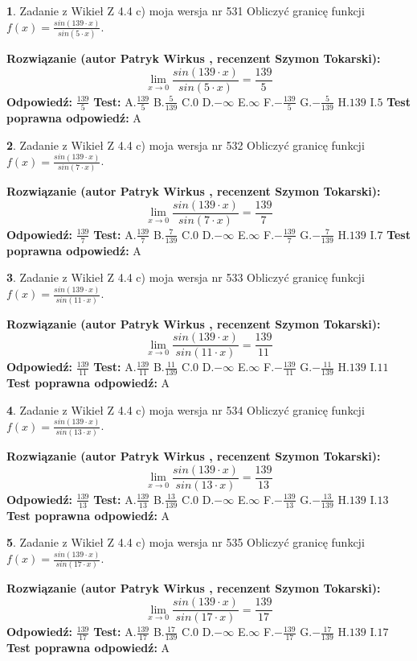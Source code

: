 \documentclass[12pt, a4paper]{article}
\theoremstyle{definition} %
\newtheorem{zad}{}
\newcommand{\zadStart}[1]{\begin{zad}#1\newline}
\newcommand{\zadStop}{\end{zad}}
\newcommand{\rozwStart}[2]{\noindent \textbf{Rozwiązanie (autor #1 , recenzent #2): }\newline}
\newcommand{\rozwStop}{\newline}
\newcommand{\odpStart}{\noindent \textbf{Odpowiedź:}\newline}
\newcommand{\odpStop}{\newline}
\newcommand{\testStart}{\noindent \textbf{Test:}\newline}
\newcommand{\testStop}{\newline}
\newcommand{\kluczStart}{\noindent \textbf{Test poprawna odpowiedź:}\newline}
\newcommand{\kluczStop}{\newline}
\begin{document}
\zadStart{Zadanie z Wikieł Z 4.4 c) moja wersja nr 531}
Obliczyć granicę funkcji $f(x)=\frac{sin(139\cdot x)}{sin(5\cdot x)}$.
\zadStop
\rozwStart{Patryk Wirkus}{Szymon Tokarski}
$$\lim\limits_{x\to 0}\frac{sin(139\cdot x)}{sin(5\cdot x)}=
\frac{139}{5}$$
\rozwStop
\odpStart
$\frac{139}{5}$
\odpStop
\testStart
A.$\frac{139}{5}$
B.$\frac{5}{139}$
C.$0$
D.$-\infty$
E.$\infty$
F.$-\frac{139}{5}$
G.$-\frac{5}{139}$
H.$139$
I.$5$
\testStop
\kluczStart
A
\kluczStop



\zadStart{Zadanie z Wikieł Z 4.4 c) moja wersja nr 532}
Obliczyć granicę funkcji $f(x)=\frac{sin(139\cdot x)}{sin(7\cdot x)}$.
\zadStop
\rozwStart{Patryk Wirkus}{Szymon Tokarski}
$$\lim\limits_{x\to 0}\frac{sin(139\cdot x)}{sin(7\cdot x)}=
\frac{139}{7}$$
\rozwStop
\odpStart
$\frac{139}{7}$
\odpStop
\testStart
A.$\frac{139}{7}$
B.$\frac{7}{139}$
C.$0$
D.$-\infty$
E.$\infty$
F.$-\frac{139}{7}$
G.$-\frac{7}{139}$
H.$139$
I.$7$
\testStop
\kluczStart
A
\kluczStop



\zadStart{Zadanie z Wikieł Z 4.4 c) moja wersja nr 533}
Obliczyć granicę funkcji $f(x)=\frac{sin(139\cdot x)}{sin(11\cdot x)}$.
\zadStop
\rozwStart{Patryk Wirkus}{Szymon Tokarski}
$$\lim\limits_{x\to 0}\frac{sin(139\cdot x)}{sin(11\cdot x)}=
\frac{139}{11}$$
\rozwStop
\odpStart
$\frac{139}{11}$
\odpStop
\testStart
A.$\frac{139}{11}$
B.$\frac{11}{139}$
C.$0$
D.$-\infty$
E.$\infty$
F.$-\frac{139}{11}$
G.$-\frac{11}{139}$
H.$139$
I.$11$
\testStop
\kluczStart
A
\kluczStop



\zadStart{Zadanie z Wikieł Z 4.4 c) moja wersja nr 534}
Obliczyć granicę funkcji $f(x)=\frac{sin(139\cdot x)}{sin(13\cdot x)}$.
\zadStop
\rozwStart{Patryk Wirkus}{Szymon Tokarski}
$$\lim\limits_{x\to 0}\frac{sin(139\cdot x)}{sin(13\cdot x)}=
\frac{139}{13}$$
\rozwStop
\odpStart
$\frac{139}{13}$
\odpStop
\testStart
A.$\frac{139}{13}$
B.$\frac{13}{139}$
C.$0$
D.$-\infty$
E.$\infty$
F.$-\frac{139}{13}$
G.$-\frac{13}{139}$
H.$139$
I.$13$
\testStop
\kluczStart
A
\kluczStop



\zadStart{Zadanie z Wikieł Z 4.4 c) moja wersja nr 535}
Obliczyć granicę funkcji $f(x)=\frac{sin(139\cdot x)}{sin(17\cdot x)}$.
\zadStop
\rozwStart{Patryk Wirkus}{Szymon Tokarski}
$$\lim\limits_{x\to 0}\frac{sin(139\cdot x)}{sin(17\cdot x)}=
\frac{139}{17}$$
\rozwStop
\odpStart
$\frac{139}{17}$
\odpStop
\testStart
A.$\frac{139}{17}$
B.$\frac{17}{139}$
C.$0$
D.$-\infty$
E.$\infty$
F.$-\frac{139}{17}$
G.$-\frac{17}{139}$
H.$139$
I.$17$
\testStop
\kluczStart
A
\kluczStop
\end{document}
